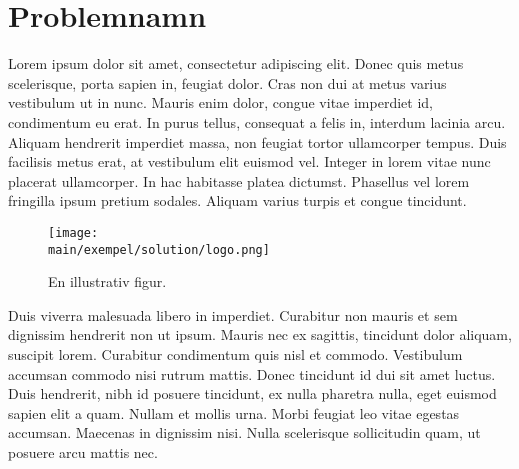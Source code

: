 \documentclass[\main/solutions.tex]{subfiles}
\begin{document}
\section{Problemnamn}
Lorem ipsum dolor sit amet, consectetur adipiscing elit. Donec quis metus scelerisque, porta sapien in, feugiat dolor. Cras non dui at metus varius vestibulum ut in nunc. Mauris enim dolor, congue vitae imperdiet id, condimentum eu erat. In purus tellus, consequat a felis in, interdum lacinia arcu. Aliquam hendrerit imperdiet massa, non feugiat tortor ullamcorper tempus. Duis facilisis metus erat, at vestibulum elit euismod vel. Integer in lorem vitae nunc placerat ullamcorper. In hac habitasse platea dictumst. Phasellus vel lorem fringilla ipsum pretium sodales. Aliquam varius turpis et congue tincidunt.

\begin{figure}[htpb]
    \centering
    \texttt{[image: \\main/exempel/solution/logo.png]}
    \caption{En illustrativ figur.}
    \label{fig:nicefigure}
\end{figure}

Duis viverra malesuada libero in imperdiet. Curabitur non mauris et sem dignissim hendrerit non ut ipsum. Mauris nec ex sagittis, tincidunt dolor aliquam, suscipit lorem. Curabitur condimentum quis nisl et commodo. Vestibulum accumsan commodo nisi rutrum mattis. Donec tincidunt id dui sit amet luctus. Duis hendrerit, nibh id posuere tincidunt, ex nulla pharetra nulla, eget euismod sapien elit a quam. Nullam et mollis urna. Morbi feugiat leo vitae egestas accumsan. Maecenas in dignissim nisi. Nulla scelerisque sollicitudin quam, ut posuere arcu mattis nec.


\end{document}
